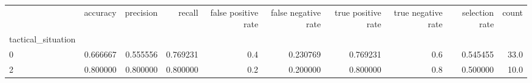 \begin{tabular}{lrrrrrrrrr}
\toprule
{} &  accuracy &  precision &    recall &  false positive rate &  false negative rate &  true positive rate &  true negative rate &  selection rate &  count \\
tactical\_situation &           &            &           &                      &                      &                     &                     &                 &        \\
\midrule
0                  &  0.666667 &   0.555556 &  0.769231 &                  0.4 &             0.230769 &            0.769231 &                 0.6 &        0.545455 &   33.0 \\
2                  &  0.800000 &   0.800000 &  0.800000 &                  0.2 &             0.200000 &            0.800000 &                 0.8 &        0.500000 &   10.0 \\
\bottomrule
\end{tabular}
